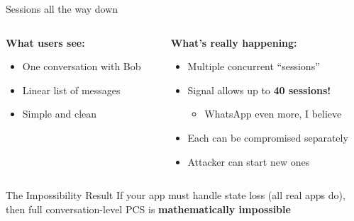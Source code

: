 \documentclass[aspectratio=169, lualatex, handout]{beamer}
\begin{document}
\begin{frame}{Sessions all the way down}
	\begin{columns}[c]
		\begin{column}{0.5\textwidth}
			\textbf{What users see:}
			\begin{itemize}
				\item One conversation with Bob
				\item Linear list of messages
				\item Simple and clean
			\end{itemize}
		\end{column}
		\begin{column}{0.5\textwidth}
			\textbf{What's really happening:}
			\begin{itemize}
				\item Multiple concurrent ``sessions''
				\item Signal allows up to \textbf{40 sessions!}
				      \begin{itemize}
					      \item WhatsApp even more, I believe
				      \end{itemize}
				\item Each can be compromised separately
				\item Attacker can start new ones
			\end{itemize}
		\end{column}
	\end{columns}
	\begin{block}{The Impossibility Result}
		If your app must handle state loss (all real apps do), then full conversation-level PCS is \textbf{mathematically impossible}
	\end{block}
\end{frame}
\end{document}
